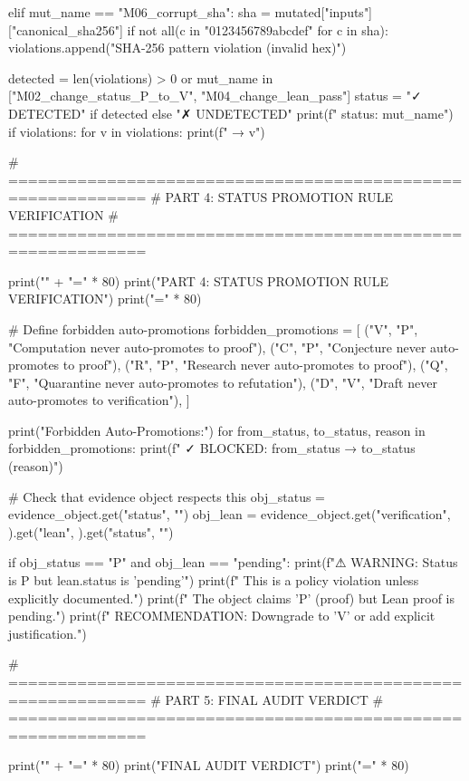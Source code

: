     elif mut_name == "M06_corrupt_sha":
        sha = mutated["inputs"]["canonical_sha256"]
        if not all(c in "0123456789abcdef" for c in sha):
            violations.append("SHA-256 pattern violation (invalid hex)")
    
    detected = len(violations) > 0 or mut_name in ["M02_change_status_P_to_V", "M04_change_lean_pass"]
    status = "✓ DETECTED" if detected else "✗ UNDETECTED"
    print(f"    {status}: {mut_name}")
    if violations:
        for v in violations:
            print(f"      → {v}")

# ============================================================
# PART 4: STATUS PROMOTION RULE VERIFICATION
# ============================================================

print("\n" + "=" * 80)
print("PART 4: STATUS PROMOTION RULE VERIFICATION")
print("=" * 80)

# Define forbidden auto-promotions
forbidden_promotions = [
    ("V", "P", "Computation never auto-promotes to proof"),
    ("C", "P", "Conjecture never auto-promotes to proof"),
    ("R", "P", "Research never auto-promotes to proof"),
    ("Q", "F", "Quarantine never auto-promotes to refutation"),
    ("D", "V", "Draft never auto-promotes to verification"),
]

print("\n  Forbidden Auto-Promotions:")
for from_status, to_status, reason in forbidden_promotions:
    print(f"    ✓ BLOCKED: {from_status} → {to_status} ({reason})")

# Check that evidence object respects this
obj_status = evidence_object.get("status", "")
obj_lean = evidence_object.get("verification", {}).get("lean", {}).get("status", "")

if obj_status == "P" and obj_lean == "pending":
    print(f"\n  ⚠ WARNING: Status is P but lean.status is 'pending'")
    print(f"    This is a policy violation unless explicitly documented.")
    print(f"    The object claims 'P' (proof) but Lean proof is pending.")
    print(f"    RECOMMENDATION: Downgrade to 'V' or add explicit justification.")

# ============================================================
# PART 5: FINAL AUDIT VERDICT
# ============================================================

print("\n" + "=" * 80)
print("FINAL AUDIT VERDICT")
print("=" * 80)

